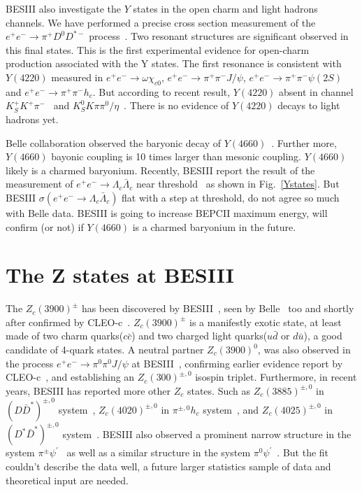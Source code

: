 \documentclass{jps-cp}
\begin{document}
BESIII also investigate the $Y$ states in the open charm and light hadrons channels. We have performed a precise cross section measurement of the $e^{+}e^{-}\rightarrow\pi^{+}D^{0}D^{*-}$ process~\cite{DDstarpiBESIII_cross}. Two resonant structures are significant observed in this final states. This is the first experimental evidence for open-charm production associated with the Y states. The first resonance is consistent with $Y(4220)$ measured in $e^{+}e^{-}\rightarrow\omega\chi_{c0}$, $e^{+}e^{-}\rightarrow\pi^{+}\pi^{-}J/\psi$, $e^{+}e^{-}\rightarrow\pi^{+}\pi^{-}\psi(2S)$ and  $e^{+}e^{-}\rightarrow\pi^{+}\pi^{-}h_{c}$. But according to recent result, $Y(4220)$ absent in channel $K^{+}_{S}K^{+}\pi^{-}$~\cite{KKpiBESIII_cross} and $K^{0}_{S}K\pi\pi^{0}/\eta$~\cite{KKpipiBESIII_cross}. There  is no evidence of $Y(4220)$ decays to light hadrons yet.

Belle collaboration observed the baryonic decay of $Y(4660)$~\cite{labdacBelle_cross}. Further more, $Y(4660)$ bayonic coupling is 10 times larger than mesonic coupling. $Y(4660)$ likely is a charmed baryonium. Recently, BESIII report the result of the measurement of $e^{+}e^{-} \rightarrow \Lambda_{c}\bar{\Lambda}_{c}$ near threshold~\cite{labdacBESIII_cross} as shown in Fig.~\ref{Ystates}. But BESIII $\sigma(e^{+}e^{-} \rightarrow \Lambda_{c}\bar{\Lambda}_{c})$ flat with a step at threshold, do not agree so much with Belle data. BESIII is going to increase BEPCII maximum energy,  will confirm (or not) if $Y(4660)$ is a charmed baryonium in the future.



\section{The Z states at BESIII}

The $Z_{c}(3900)^{\pm}$ has been discovered by BESIII~\cite{Zc3900piJpsiBESIII}, seen by Belle~\cite{Zc3900piJpsiBelle} too and shortly after confirmed by CLEO-c~\cite{Zc3900piJpsiCLEOc}. $Z_{c}(3900)^{\pm}$ is a manifestly exotic state, at least made of two charm quarks($c\bar{c}$) and two charged light quarks($u\bar{d}$ or $d\bar{u}$), a good candidate of 4-quark states. A neutral partner $Z_{c}(3900)^{0}$, was also observed in the process $e^{+}e^{-}\rightarrow\pi^{0}\pi^{0}J/\psi$ at BESIII~\cite{Zc3900pi0JpsiBESIII}, confirming earlier evidence report by CLEO-c~\cite{Zc3900piJpsiCLEOc}, and establishing an $Z_{c}(300)^{\pm,0}$ isospin triplet. Furthermore, in recent years, BESIII has reported more other $Z_{c}$ states. Such as $Z_{c}(3885)^{\pm,0}$ in $(D\bar{D}^{*})^{\pm,0}$ system~\cite{Zc3885_charge_BESIII,Zc3885_charge_doubleD_BESIII,Zc3885_neutral_BESIII}, $Z_{c}(4020)^{\pm,0}$ in $\pi^{\pm,0}h_{c}$ system~\cite{Zc40200pihcBESIII,Zc40200pi0hcBESIII}, and $Z_{c}(4025)^{\pm,0}$ in $(D^{*}\bar{D}^{*})^{\pm,0}$ system~\cite{Zc4025_charge_BESIII,Zc4025_neutral_BESIII}. 
BESIII also observed a prominent narrow structure in the system $\pi^{\pm} \psi^{'}$~\cite{pipipsi3686BESIII} as well as a similar structure in the system $\pi^{0} \psi^{'}$~\cite{pi0pi0psi3686BESIII}.  But the fit couldn't describe the data well, a future larger statistics sample of data and theoretical input are needed.
\end{document}

